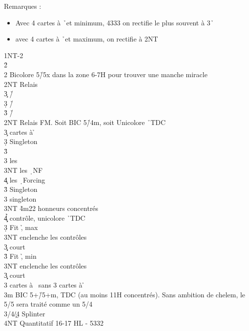 \documentclass[a4paper]{article}
\begin{document}
Remarques :

\begin{itemize}
\item Avec 4 cartes à \h\ et minimum, 4333 on rectifie le plus souvent à 3\h\ 

\item avec 4 cartes à \h\ et maximum, on rectifie à 2NT

\end{itemize}

\begin{bidtable}
1NT-2\d\\
2\h\+\\
2\s \> Bicolore 5\h /5x dans la zone 6-7H pour trouver une manche miracle\+\\
2NT \> Relais\+\\
3\c \> \h /\c \\
3\d \> \h /\d \\
3\h \> \h /\s \-\-\\
2NT \> Relais FM. Soit BIC 5\h /4m, soit Unicolore \h\ TDC\+\\
3\c {} cartes à \h \+\\
3\d \> Singleton \s \+\\
3\h\+\\
3\s \> les \c \\
3NT \> les \d\ NF\\
4\c \> les \d\ Forcing\-\-\\
3\h \> Singleton \c \\
3\s \> singleton \d \\
3NT \h 4m22 honneurs concentrés\\
4\c\d\h \> contrôle, unicolore \h\ TDC\-\\
3\d \> Fit \h , max\+\\
3NT \> enclenche les contrôles\+\\
3\c\d \> court\-\-\\
3\h \> Fit \h , min\+\\
3NT \> enclenche les contrôles\+\\
3\c\d \> court\-\-\\
3\s {} cartes à \s\ sans 3 cartes à \h \-\\
3m \> BIC 5+\h /5+m, TDC (au moins 11H concentrés). Sans ambition de chelem, le 5/5 sera traité comme un 5/4\\
3\s/4\c/4\d \> Splinter\\
4NT \> Quantitatif 16-17 HL - 5332\-
\end{bidtable}
\end{document}
